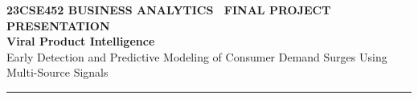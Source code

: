 \documentclass[aspectratio=169, 10pt]{beamer}
\begin{document}
    \begin{frame}[plain]                                                                                                                                                                               
        \vspace{0.35cm}                                                                                                                                                                                
        \begin{center}                                                                                                                                                                                 
            {\fontsize{8.5pt}{10pt}\selectfont \textbf{\color{BlueAccent}23CSE452 BUSINESS ANALYTICS \textbullet\ FINAL PROJECT PRESENTATION}}\\[0.18cm]                                               
            {\fontsize{16pt}{19pt}\selectfont \textbf{\color{NavyPrimary}Viral Product Intelligence}}\\[0.10cm]                                                                                        
            {\fontsize{10pt}{12pt}\selectfont \color{DarkText}Early Detection and Predictive Modeling of Consumer Demand Surges Using Multi-Source Signals}\\[0.20cm]                                  
            \textcolor{CoralAccent}{\rule{0.35\paperwidth}{1.2pt}}\\[0.25cm]                                                                                                                           
                                                                                                                                                                                                       

\end{center}
\end{frame}
\end{document}
